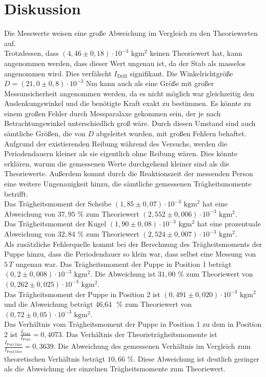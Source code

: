 \section{Diskussion}
\label{sec:Diskussion}
Die Messwerte weisen eine große Abweichung im Vergleich zu den Theoriewerten auf.  \\
Trotzdessen, dass $(4,46 \pm 0,18) \cdot 10^{-3} \,\,\unit{\kilo\gram\meter\squared}$ keinen Theoriewert hat, kann angenommen werden, dass 
dieser Wert ungenau ist, da der Stab 
als masselos angenommen wird. Dies verfälscht $I_{\text{Drill}}$ signifikant. Die Winkelrichtgröße 
$D = (21,0 \pm 0,8) \cdot 10^{-3} \,\,\unit{\newton\meter}$ kann auch als eine Größe mit großer Messunsicherheit angenommen
werden, da es nicht möglich war gleichzeitig den Auslenkungswinkel und die benötigte Kraft exakt zu bestimmen. Es könnte zu einem großen 
Fehler durch Messparalaxe gekommen sein, der je nach Betrachtungswinkel unterschiedlich groß wäre. Durch diesen Umstand sind auch sämtliche 
Größen, die von $D$ abgeleitet wurden, mit großen Fehlern behaftet. \\
Aufgrund der existierenden Reibung während des Versuchs, werden die 
Periodendauern kleiner als sie eigentlich ohne Reibung wären. Dies könnte erklären, warum die gemessenen Werte durchgehend kleiner sind als die 
Theoriewerte. Außerdem kommt durch die Reaktionszeit der messenden Person eine weitere Ungenauigkeit hinzu, die sämtliche gemessenen 
Trägheitsmomente betrifft.\\
Das Trägheitsmoment der Scheibe $(1,85 \pm 0,07) \cdot 10^{-3} \,\,\unit{\kilo\gram\meter\squared}$ hat eine Abweichung von $37,95 \,\,\%$ 
zum Theoriewert $(2,552 \pm 0,006) \cdot 10^{-3} \,\,\unit{\kilo\gram\meter\squared}$.\\
Das Trägheitsmoment der Kugel $(1,90 \pm 0,08) \cdot 10^{-3} \,\,\unit{\kilo\gram\meter\squared}$ hat eine prozentuale 
Abweichung von $32,84 \,\,\%$ zum Theoriewert $(2,524 \pm 0,007) \cdot 10^{-3} \,\,\unit{\kilo\gram\meter\squared}$. \\
Als zusätzliche Fehlerquelle kommt bei der Berechnung des Trägheitsmoments der Puppe hinzu, dass die Periodendauer so klein war, dass selbst eine
Messung von $5\,T$ ungenau war. Das Trägheitsmoment der Puppe in Position 1 beträgt $(0,2 \pm 0,008) \cdot 10^{-3}\,\, \unit{\kilo\gram\meter\squared}$.
 Die Abweichung ist $31,00 \,\,\%$ zum Theoriewert von $(0,262 \pm 0,025) \cdot 10^{-3}\,\, \unit{\kilo\gram\meter\squared}$.\\
Das Trägheitsmoment der Puppe in Position 2 ist $ (0,491 \pm 0,020) \cdot 10^{-3}\,\, \unit{\kilo\gram\meter\squared}$ und die Abweichung beträgt 46,64 \,\,\% zum Theoriewert 
von $(0,72 \pm 0,05) \cdot 10^{-3}\,\, \unit{\kilo\gram\meter\squared}$.\\
Das Verhältnis vom Trägheitsmoment der Puppe in Position 1 zu dem in Position 2 ist $\frac{I_{\text{Pos1}}}{I_{\text{Pos2}}} = 0,4073$. Das
Verhältnis der Theorieträgheitsmomente ist $\frac{I_{\text{Pos1,theo}}}{I_{\text{Pos2,theo}}} = 0,3639$. Die Abweichung des gemessenen Verhältnis im
Vergleich zum theoretischen Verhältnis beträgt $10,66 \,\,\%$. Diese Abweichung ist deutlich geringer als die Abweichung der einzelnen Trägheitsmomente 
zum Theoriewert. 
%
